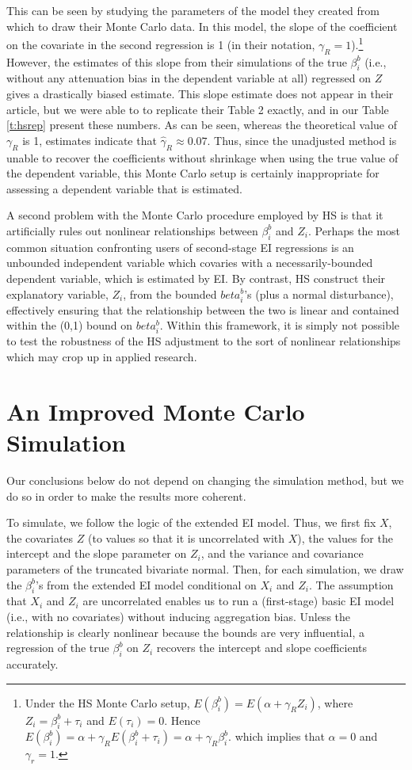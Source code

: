 \documentclass[11pt,titlepage]{article}
\begin{document}
This can be seen by studying the parameters of the model they created
from which to draw their Monte Carlo data.  In this model, the slope
of the coefficient on the covariate in the second regression is 1 (in
their notation, $\gamma_R=1$).\footnote{Under the HS Monte Carlo
  setup, $E(\beta_i^b)=E(\alpha+\gamma_R Z_i)$, where
  $Z_i=\beta_i^b+\tau_i$ and $E(\tau_i)=0$.  Hence
  $E(\beta_i^b)=\alpha+\gamma_RE(\beta_i^b+\tau_i)=\alpha+\gamma_R\beta_i^b$.
  which implies that $\alpha=0$ and $\gamma_r=1$.}  However, the
estimates of this slope from their simulations of the true $\beta_i^b$
(i.e., without any attenuation bias in the dependent variable at all)
regressed on $Z$ gives a drastically biased estimate.  This slope
estimate does not appear in their article, but we were able to to
replicate their Table 2 exactly, and in our Table \ref{t:hsrep}
present these numbers.  As can be seen, whereas the theoretical value
of $\gamma_R$ is 1, estimates indicate that $\hat\gamma_R\approx
0.07$.  Thus, since the unadjusted method is unable to recover the
coefficients without shrinkage when using the true value of the
dependent variable, this Monte Carlo setup is certainly inappropriate
for assessing a dependent variable that is estimated.

A second problem with the Monte Carlo procedure employed by HS is that
it artificially rules out nonlinear relationships between $\beta_i^b$
and $Z_i$.  Perhaps the most common situation confronting users of
second-stage EI regressions is an unbounded independent variable which
covaries with a necessarily-bounded dependent variable, which is
estimated by EI.  By contrast, HS construct their explanatory
variable, $Z_i$, from the bounded $beta_i^b$'s (plus a normal
disturbance), effectively ensuring that the relationship between the
two is linear and contained within the (0,1) bound on $beta_i^b$.
Within this framework, it is simply not possible to test the
robustness of the HS adjustment to the sort of nonlinear relationships
which may crop up in applied research.

\section{An Improved Monte Carlo Simulation} \label{s:alt}

Our conclusions below do not depend on changing the simulation method,
but we do so in order to make the results more coherent.

To simulate, we follow the logic of the extended EI model.  Thus, we
first fix $X$, the covariates $Z$ (to values so that it is
uncorrelated with $X$), the values for the intercept and the slope
parameter on $Z_i$, and the variance and covariance parameters of the
truncated bivariate normal.  Then, for each simulation, we draw the
$\beta_i^b$'s from the extended EI model conditional on $X_i$ and
$Z_i$.  The assumption that $X_i$ and $Z_i$ are uncorrelated enables
us to run a (first-stage) basic EI model (i.e., with no covariates)
without inducing aggregation bias.  Unless the relationship is clearly
nonlinear because the bounds are very influential, a regression of the
true $\beta_i^b$ on $Z_i$ recovers the intercept and slope
coefficients accurately.
\end{document}
